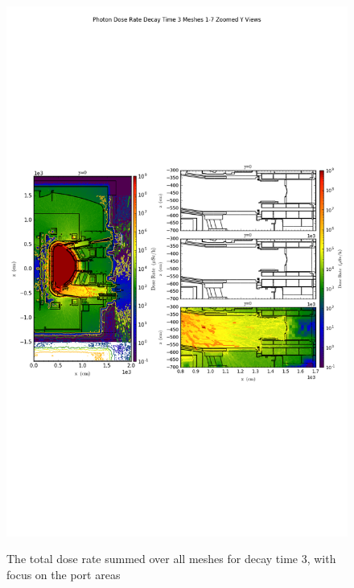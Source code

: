 \documentclass[12pt]{article}
\begin{document}
\begin{figure}[ht!]
\centering
\includegraphics[trim={0cm 9cm 0cm 10cm},clip,scale=0.75]{../plots/final_model/Photon_Dose_Rate_Decay_Time_3_Meshes_1-7_Zoomed_Y_Views.png}
\label{fig:photons_dc3_no4bc_total_zoomed}
\caption{The total dose rate summed over all meshes for decay time 3, with focus on the port areas}
\end{figure}
\end{document}
